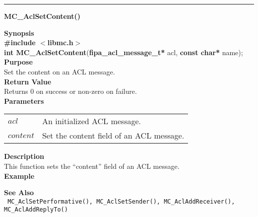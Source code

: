 \noindent
\vspace{5pt}
\rule{6.5in}{0.015in}
\noindent
{}
{\LARGE \bf MC\_AclSetContent()}\\
\label{api:MC_Acl_SetContent()}

\noindent
{\bf Synopsis}\\
{\bf \#include $<$libmc.h$>$}\\
{\bf int MC\_AclSetContent}({\bf fipa\_acl\_message\_t*} acl, {\bf const char*} name);\\

\noindent
{\bf Purpose}\\
Set the content on an ACL message.\\

\noindent
{\bf Return Value}\\
Returns 0 on success or non-zero on failure.\\

\noindent
{\bf Parameters}
\vspace{-0.1in}
\begin{description}
\item
\begin{tabular}{p{10 mm}p{145 mm}} 
$acl$ & An initialized ACL message. \\
$content$ & Set the content field of an ACL message.
\end{tabular}
\end{description}

\noindent
{\bf Description}\\
This function sets the ``content'' field of an ACL message. \\

\noindent
{\bf Example}\\
\noindent
{\footnotesize}

\noindent
{\bf See Also}\\
\texttt{
  MC\_AclSetPerformative(), MC\_AclSetSender(), MC\_AclAddReceiver(), 
    \linebreak MC\_AclAddReplyTo()
}

